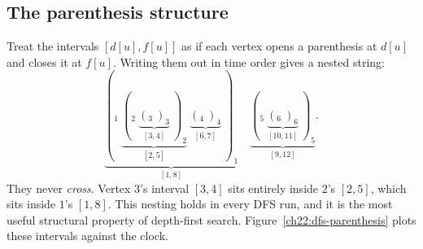 \subsection{The parenthesis structure}
\label{ch22:parenthesis}

Treat the intervals $[d[u], f[u]]$ as if each vertex opens a parenthesis at
$d[u]$ and closes it at $f[u]$. Writing them out in time order gives a nested
string:
\[
\underbrace{(_1\ \underbrace{(_2\ \underbrace{(_3\ )_3}_{[3,4]}\ )_2}_{[2,5]}\ \underbrace{(_4\ )_4}_{[6,7]}\ )_1}_{[1,8]}\quad
\underbrace{(_5\ \underbrace{(_6\ )_6}_{[10,11]}\ )_5}_{[9,12]}.
\]
They never \emph{cross}. Vertex $3$'s interval $[3,4]$ sits entirely inside
$2$'s $[2,5]$, which sits inside $1$'s $[1,8]$. This nesting holds in every
DFS run, and it is the most useful structural property of depth-first
search. Figure~\ref{ch22:dfs-parenthesis}
plots these intervals against the clock.

